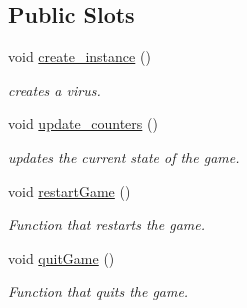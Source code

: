 \subsection*{Public Slots}
\begin{DoxyCompactItemize}
\item 
void \hyperlink{classgame1scene_ac85bfe270f65bee86ea75f8a0dafcd39}{create\+\_\+instance} ()
\begin{DoxyCompactList}\small\item\em creates a virus. \end{DoxyCompactList}\item 
void \hyperlink{classgame1scene_a4e66bd7b75ee140431a9ae8f9fa40000}{update\+\_\+counters} ()
\begin{DoxyCompactList}\small\item\em updates the current state of the game. \end{DoxyCompactList}\item 
void \hyperlink{classgame1scene_a62ae0fdc247d9cd0665844710b465c5c}{restart\+Game} ()
\begin{DoxyCompactList}\small\item\em Function that restarts the game. \end{DoxyCompactList}\item 
void \hyperlink{classgame1scene_a72b63628ea5dc651654db088830afd87}{quit\+Game} ()
\begin{DoxyCompactList}\small\item\em Function that quits the game. \end{DoxyCompactList}\end{DoxyCompactItemize}

